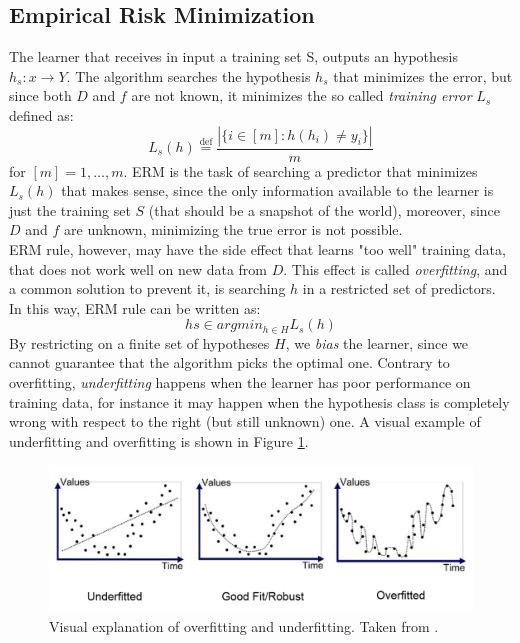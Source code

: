 \subsection{Empirical Risk Minimization}
The learner that receives in input a training set S, outputs an hypothesis $h_s : x \rightarrow Y$. The algorithm searches the hypothesis $h_s$ that minimizes the error, but since both $D$ and $f$ are not known, it minimizes the so called \textit{training error} $L_s$ defined as:
\[ L_s(h) \stackrel{\text{def}}{=} \frac{|\{i \in [m] : h(h_i) \neq y_i\}|}{m} \]
for $[m] = {1, \dots, m}$. \ac{ERM} is the task of searching a predictor that minimizes $L_s(h)$ that makes sense, since the only information available to the learner is just the training set $S$ (that should be a snapshot of the world), moreover, since $D$ and $f$ are unknown, minimizing the true error is not possible.\\
\ac{ERM} rule, however, may have the side effect that learns "too well" training data, that does not work well on new data from $D$. This effect is called \textit{overfitting}, and a common solution to prevent it, is searching $h$ in a restricted set of predictors. In this way, \ac{ERM} rule can be written as:
\[hs \in argmin_{h \in H} L_s(h)\]
By restricting on a finite set of hypotheses $H$, we \textit{bias} the learner, since we cannot guarantee that the algorithm picks the optimal one. Contrary to overfitting, \textit{underfitting} happens when the learner has poor performance on training data, for instance it may happen when the hypothesis class is completely wrong with respect to the right (but still unknown) one. A visual example of underfitting and overfitting is shown in Figure \ref{fig:overfit-underfit}.

\begin{figure}
	\centering
	\includegraphics[width=1\textwidth]{figures/overfit-underfit.png}
	\caption{Visual explanation of overfitting and underfitting. Taken from \cite{underfit-overfit}.}
	\label{fig:overfit-underfit}
\end{figure}


